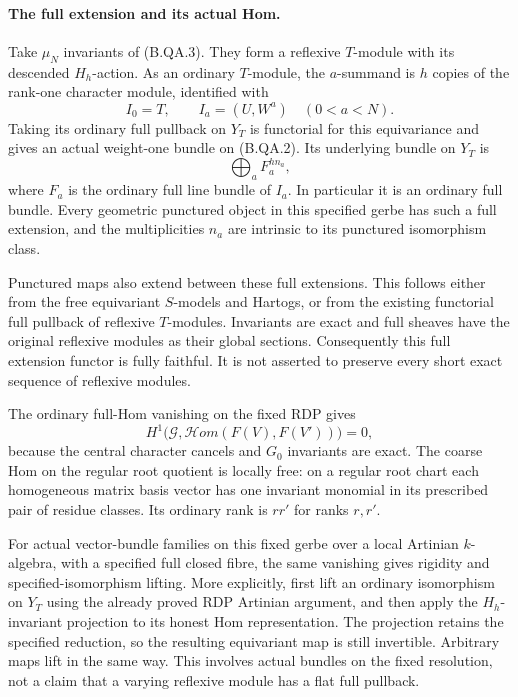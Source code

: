 \paragraph{The full extension and its actual Hom.}
Take $\mu_N$ invariants of (B.QA.3).  They form a reflexive $T$-module
with its descended $H_h$-action.  As an ordinary $T$-module, the
$a$-summand is $h$ copies of the rank-one character module, identified
with
\[
 I_0=T,\qquad I_a=(U,W^a)\quad(0<a<N).
\]
Taking its ordinary full pullback on $Y_T$ is functorial for this
equivariance and gives an actual weight-one bundle on (B.QA.2).
Its underlying bundle on $Y_T$ is
\[
                    \bigoplus_a F_a^{h n_a},            \tag{B.QA.5}
\]
where $F_a$ is the ordinary full line bundle of $I_a$.  In particular
it is an ordinary full bundle.  Every geometric punctured object in
this specified gerbe has such a full extension, and the multiplicities
$n_a$ are intrinsic to its punctured isomorphism class.

Punctured maps also extend between these full extensions.  This follows
either from the free equivariant $S$-models and Hartogs, or from the
existing functorial full pullback of reflexive $T$-modules.  Invariants
are exact and full sheaves have the original reflexive modules as
their global sections.  Consequently this full extension functor is
fully faithful.  It is not asserted to preserve every short exact
sequence of reflexive modules.

The ordinary full-Hom vanishing on the fixed RDP gives
\[
 H^1\bigl(\mathcal G,
          \mathcal Hom(F(V),F(V'))\bigr)=0,             \tag{B.QA.6}
\]
because the central character cancels and $G_0$ invariants are exact.
The coarse Hom on the regular root quotient is locally free: on a
regular root chart each homogeneous matrix basis vector has one
invariant monomial in its prescribed pair of residue classes.
Its ordinary rank is $rr'$ for ranks $r,r'$.

For actual vector-bundle families on this fixed gerbe over a local
Artinian $k$-algebra, with a specified full closed fibre, the same
vanishing gives rigidity and specified-isomorphism lifting.  More
explicitly, first lift an ordinary isomorphism on $Y_T$ using the
already proved RDP Artinian argument, and then apply the $H_h$-invariant
projection to its honest Hom representation.  The projection retains
the specified reduction, so the resulting equivariant map is still
invertible.  Arbitrary maps lift in the same way.  This involves actual
bundles on the fixed resolution, not a claim that a varying reflexive
module has a flat full pullback.

